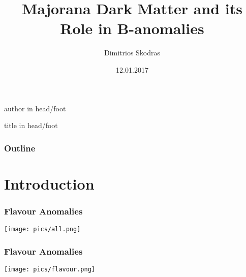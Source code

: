 \documentclass[hyperref={pdfpagelabels=false}]{beamer}
\title{Majorana Dark Matter and its Role in B-anomalies}
\institute{Technische Universit\"at Dortmund}
\author{Dimitrios Skodras}
\date{12.01.2017}
\begin{document}
{%
  \leavevmode%
 \begin{beamercolorbox}%
    [wd=.5\paperwidth,ht=2.5ex,dp=1.125ex,leftskip=.3cm,rightskip=.3cm]%
    {author in head/foot}%
    \hfill\insertshortauthor
  \end{beamercolorbox}%
  \begin{beamercolorbox}%
    [wd=.5\paperwidth,ht=2.5ex,dp=1.125ex,leftskip=.3cm ,rightskip=.3cm]%
    {title in head/foot}%
    \insertshorttitle\hfill\insertframenumber{}
  \end{beamercolorbox}%
}%

\captionsetup[figure]{font=small,skip=0pt}
\begin{frame}
\titlepage
\end{frame} 

% 
% 
\begin{frame}
\frametitle{Outline}
\tableofcontents
\end{frame} 

\section{Introduction}



\begin{frame}
\frametitle{Flavour Anomalies}
\setcounter{framenumber}{3}
  \texttt{[image: pics/all.png]}
\end{frame}
\begin{frame}
\frametitle{Flavour Anomalies}

 \setcounter{framenumber}{3}
  \texttt{[image: pics/flavour.png]}
\end{frame}
\end{document}
